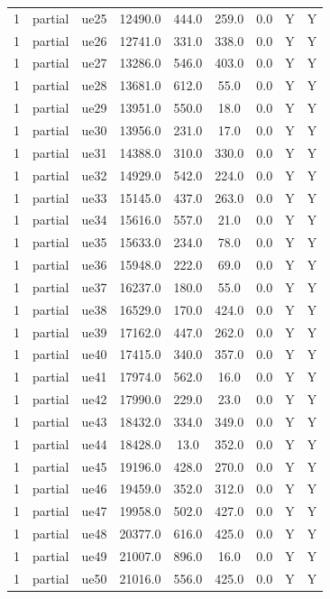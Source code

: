 \begin{table}[ht]
\begin{tabular}{|c|c|c|c|c|c|c|c|c|}
1 & partial & ue25 & 12490.0 & 444.0 & 259.0 & 0.0 & Y & Y \\
1 & partial & ue26 & 12741.0 & 331.0 & 338.0 & 0.0 & Y & Y \\
1 & partial & ue27 & 13286.0 & 546.0 & 403.0 & 0.0 & Y & Y \\
1 & partial & ue28 & 13681.0 & 612.0 & 55.0 & 0.0 & Y & Y \\
1 & partial & ue29 & 13951.0 & 550.0 & 18.0 & 0.0 & Y & Y \\
1 & partial & ue30 & 13956.0 & 231.0 & 17.0 & 0.0 & Y & Y \\
1 & partial & ue31 & 14388.0 & 310.0 & 330.0 & 0.0 & Y & Y \\
1 & partial & ue32 & 14929.0 & 542.0 & 224.0 & 0.0 & Y & Y \\
1 & partial & ue33 & 15145.0 & 437.0 & 263.0 & 0.0 & Y & Y \\
1 & partial & ue34 & 15616.0 & 557.0 & 21.0 & 0.0 & Y & Y \\
1 & partial & ue35 & 15633.0 & 234.0 & 78.0 & 0.0 & Y & Y \\
1 & partial & ue36 & 15948.0 & 222.0 & 69.0 & 0.0 & Y & Y \\
1 & partial & ue37 & 16237.0 & 180.0 & 55.0 & 0.0 & Y & Y \\
1 & partial & ue38 & 16529.0 & 170.0 & 424.0 & 0.0 & Y & Y \\
1 & partial & ue39 & 17162.0 & 447.0 & 262.0 & 0.0 & Y & Y \\
1 & partial & ue40 & 17415.0 & 340.0 & 357.0 & 0.0 & Y & Y \\
1 & partial & ue41 & 17974.0 & 562.0 & 16.0 & 0.0 & Y & Y \\
1 & partial & ue42 & 17990.0 & 229.0 & 23.0 & 0.0 & Y & Y \\
1 & partial & ue43 & 18432.0 & 334.0 & 349.0 & 0.0 & Y & Y \\
1 & partial & ue44 & 18428.0 & 13.0 & 352.0 & 0.0 & Y & Y \\
1 & partial & ue45 & 19196.0 & 428.0 & 270.0 & 0.0 & Y & Y \\
1 & partial & ue46 & 19459.0 & 352.0 & 312.0 & 0.0 & Y & Y \\
1 & partial & ue47 & 19958.0 & 502.0 & 427.0 & 0.0 & Y & Y \\
1 & partial & ue48 & 20377.0 & 616.0 & 425.0 & 0.0 & Y & Y \\
1 & partial & ue49 & 21007.0 & 896.0 & 16.0 & 0.0 & Y & Y \\
1 & partial & ue50 & 21016.0 & 556.0 & 425.0 & 0.0 & Y & Y \\

\end{tabular}
\end{table}

